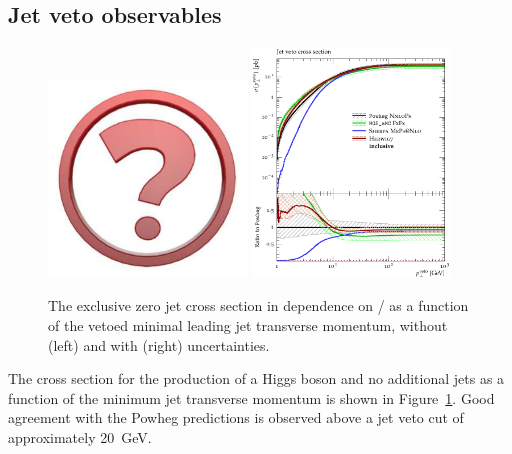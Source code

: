 \clearpage
\subsection{Jet veto observables}
\label{sec:hjetscomp:results:jvobs}

\begin{figure}[t!]
  \centering
  \includegraphics[width=0.47\textwidth]{Micon.pdf}
  \hfill
  \includegraphics[width=0.47\textwidth]{figures/hjetscomp_xs_jet_veto_j0.pdf}
  \caption{
    The exclusive zero jet cross section in dependence on / as a
    function of the vetoed minimal leading jet transverse momentum,
    without (left) and with (right) uncertainties.
    \label{fig:higgscomp:results:jvobs:jvxs0}
  }
\end{figure}

The cross section for the production of a Higgs boson and no
additional jets as a function of the minimum jet transverse momentum
is shown in Figure~\ref{fig:higgscomp:results:jvobs:jvxs0}. Good
agreement with the Powheg predictions is observed above a jet veto cut
of approximately 20~GeV.

